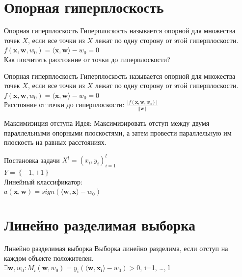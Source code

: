 \documentclass[12pt]{beamer}
\begin{document}
\section{Опорная гиперплоскость}

\begin{frame}{Опорная гиперплоскость}
	Гиперплоскость называется опорной для множества точек
	$X$, если все точки из $X$ лежат по одну сторону от этой гиперплоскости.\\\bigbreak
	${f(\mathbf{x},\mathbf{w}, w_0) = \langle \mathbf{x}, \mathbf{w}\rangle - w_0 = 0}$\\
	\bigbreak
	Как посчитать расстояние от точки до гиперплоскости?
\end{frame}

\begin{frame}{Опорная гиперплоскость}
	Гиперплоскость называется опорной для множества точек
	$X$, если все точки из $X$ лежат по одну сторону от этой гиперплоскости.\\\bigbreak
	${f(\mathbf{x},\mathbf{w}, w_0) = \langle \mathbf{x}, \mathbf{w}\rangle - w_0 = 0}$\\
	\bigbreak
	Расстояние от точки до гиперплоскости:
	$\frac{\vert f(\mathbf{x},\mathbf{w}, w_0) \vert}{\Vert \mathbf{w} \Vert}$
\end{frame}

\begin{frame}{Максимизиция отступа}
	\alert{Идея}: Максимизировать отступ между двумя параллельными опорными плоскостями, а затем провести параллельную им плоскость на равных расстояниях.\\
\end{frame}

\begin{frame}{Постановка задачи}
	${X^l = (x_i,y_i)_{i = 1}^l}$\\ 
	${Y=\left\{-1,+1\right\}}$\\
	\bigbreak
	Линейный классификатор:\\
	$a(\mathbf{x}, \mathbf{w}) = sign(\langle \mathbf{w}, \mathbf{x}\rangle - w_0)$\\
\end{frame}

\section{Линейно разделимая выборка}

\begin{frame}{Линейно разделимая выборка}
	Выборка линейно разделима, если отступ на каждом объекте положителен.\\
	\bigbreak
	$\exists \mathbf{w}, w_0 : M_i(\mathbf{w}, w_0) = y_i  (\langle \mathbf{w}, \mathbf{x_i} \rangle - w_0) > 0$, i=1, \dots , l\\
\end{frame}
\end{document}
